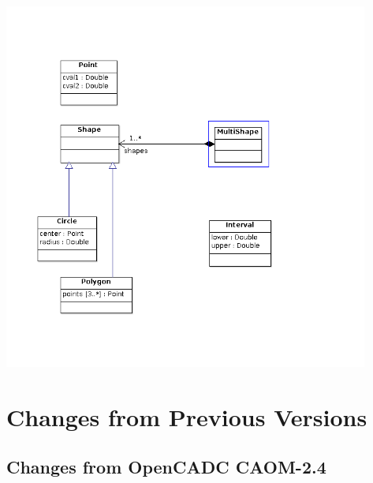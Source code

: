 \documentclass[11pt,a4paper]{ivoa}
\begin{document}
\begin{center}
\includegraphics[width=0.9\textwidth]{src/uml/DataTypes.png}
\label{fig:datatypes}
\end{center}



\appendix
\section{Changes from Previous Versions}

\subsection{Changes from OpenCADC CAOM-2.4}
\end{document}

